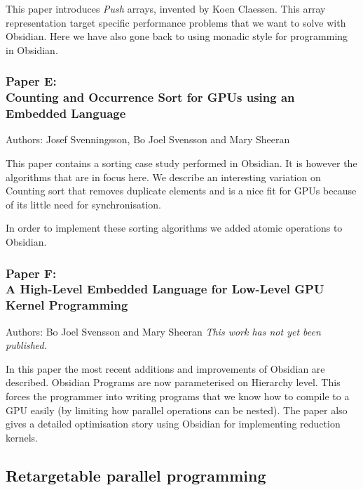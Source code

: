 \documentclass[a4paper]{book}
\newcommand{\paperE}{Paper E}
\newcommand{\paperETitle}{Counting and Occurrence Sort for GPUs using an Embedded Language}
\newcommand{\paperF}{Paper F}
\newcommand{\paperFTitle}{A High-Level Embedded Language for Low-Level GPU Kernel Programming}
\begin{document}
\vspace{5mm}

This paper introduces {\em Push} arrays, invented by Koen Claessen. This 
array representation target specific performance problems that we want 
to solve with Obsidian. Here we have also gone back to using monadic 
style for programming in Obsidian. 


\subsubsection{\paperE: \\ \paperETitle} 

Authors: Josef Svenningsson, Bo Joel Svensson and Mary Sheeran \newline

\vspace{5mm}

This paper contains a sorting case study performed in Obsidian. It 
is however the algorithms that are in focus here. We describe 
an interesting variation on Counting sort that removes duplicate 
elements and is a nice fit for GPUs because of its little need for 
synchronisation. 

In order to implement these sorting algorithms we added atomic operations 
to Obsidian. 

\subsubsection{\paperF: \\ \paperFTitle}

Authors: Bo Joel Svensson and Mary Sheeran \newline
\noindent \emph{This work has not yet been published.}
\vspace{5mm} 

\noindent 

In this paper the most recent additions and improvements of Obsidian are 
described. Obsidian Programs are now parameterised on Hierarchy level. This forces
the programmer into writing programs that we know how to compile to a GPU easily 
(by limiting how parallel operations can be nested). The paper also gives a detailed  
optimisation story using Obsidian for implementing reduction kernels. 


\subsection{Retargetable parallel programming} 
\end{document}
